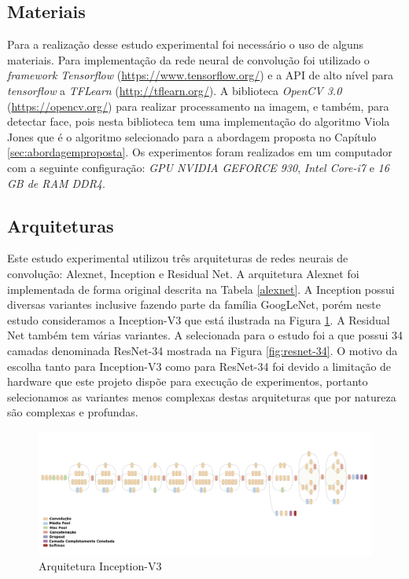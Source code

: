 \subsection{Materiais}\label{sec:material}
Para a realização desse estudo experimental foi necessário o uso de alguns materiais. Para implementação da rede neural de convolução foi utilizado o \textit{framework Tensorflow} (\url{https://www.tensorflow.org/}) e a API de alto nível para \textit{tensorflow} a \textit{TFLearn} (\url{http://tflearn.org/}). A biblioteca \textit{OpenCV 3.0} (\url{https://opencv.org/}) para realizar processamento na imagem, e também, para detectar face, pois nesta biblioteca tem uma implementação do algoritmo Viola Jones que é o algoritmo selecionado para a abordagem proposta no Capítulo \ref{sec:abordagemproposta}.
Os experimentos foram realizados em um computador com a seguinte configuração: \textit{GPU NVIDIA GEFORCE 930}, \textit{Intel Core-i7} e \textit{16 GB de RAM DDR4}. 


\subsection{Arquiteturas}
Este estudo experimental utilizou três arquiteturas de redes neurais de convolução: Alexnet, Inception e Residual Net. A arquitetura Alexnet foi implementada de forma original descrita na Tabela \ref{alexnet}.  A Inception possui diversas variantes inclusive fazendo parte da família GoogLeNet, porém neste estudo consideramos a Inception-V3 que está ilustrada na Figura \ref{fig:inceptionV3}. A Residual Net também tem várias variantes. A selecionada para o estudo foi a que possui 34 camadas denominada ResNet-34 mostrada na Figura \ref{fig:resnet-34}. O motivo da escolha tanto para Inception-V3 como para ResNet-34  
foi devido a limitação de hardware que este projeto dispõe para execução de experimentos, portanto selecionamos as variantes menos complexas destas arquiteturas que por natureza são complexas e profundas. 

\begin{figure}
\centering
\includegraphics[scale=0.33]{figuras/inceptionV3.png}
\caption{Arquitetura Inception-V3}
\label{fig:inceptionV3}
\end{figure}

